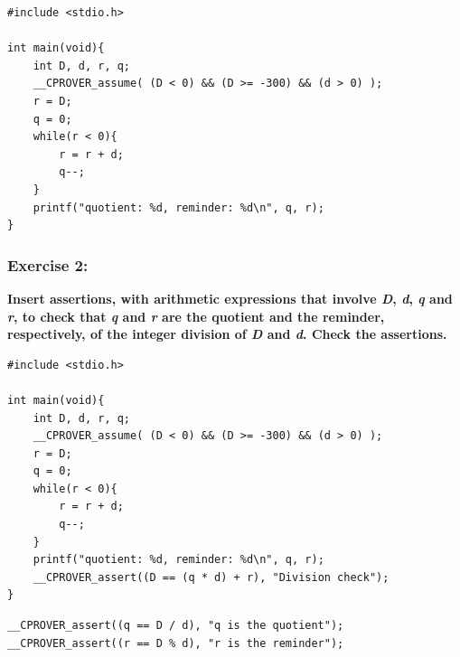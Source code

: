 \documentclass[a4paper,12pt]{article}
\begin{document}
\begin{lstlisting}
#include <stdio.h>

int main(void){
    int D, d, r, q;
    __CPROVER_assume( (D < 0) && (D >= -300) && (d > 0) );
    r = D;
    q = 0;
    while(r < 0){
        r = r + d;
        q--;
    }
    printf("quotient: %d, reminder: %d\n", q, r);
}
\end{lstlisting}

\subsubsection{Exercise 2:}
\textbf{Insert assertions, with arithmetic expressions that involve \textit{D}, \textit{d}, \textit{q} and \textit{r}, to check that \textit{q} and \textit{r} are the quotient and the reminder, respectively, of the integer division of \textit{D} and \textit{d}. Check the assertions.\\}

\begin{lstlisting}
#include <stdio.h>

int main(void){
    int D, d, r, q;
    __CPROVER_assume( (D < 0) && (D >= -300) && (d > 0) );
    r = D;
    q = 0;
    while(r < 0){
        r = r + d;
        q--;
    }
    printf("quotient: %d, reminder: %d\n", q, r);
    __CPROVER_assert((D == (q * d) + r), "Division check");
}
\end{lstlisting}


\begin{lstlisting}
__CPROVER_assert((q == D / d), "q is the quotient");
__CPROVER_assert((r == D % d), "r is the reminder");
\end{lstlisting}

\end{document}
